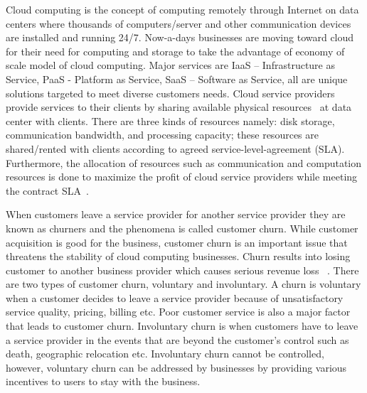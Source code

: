 Cloud computing is the concept of computing remotely through Internet on data centers where thousands of computers/server and other communication devices are installed and running 24/7. Now-a-days businesses are moving toward cloud for their need for computing and storage to take the advantage of economy of scale model of cloud computing. Major services are IaaS – Infrastructure as Service, PaaS - Platform as Service, SaaS – Software as Service, all are unique solutions targeted to meet diverse customers needs. Cloud service providers provide services to their clients by sharing available physical resources~\cite{5331755} at data center with clients. There are three kinds of resources namely: disk storage, communication bandwidth, and processing capacity; these resources are shared/rented with clients according to agreed service-level-agreement (SLA). Furthermore, the allocation of resources such as communication and computation resources is done to maximize the profit of cloud service providers while meeting the contract SLA~\cite{5176040,anand2013virtual}.

When customers leave a service provider for another service provider they are known as churners and the phenomena is called customer churn. While customer acquisition is good for the business, customer churn is an important issue that threatens the stability of cloud computing businesses. Churn results into losing customer to another business provider which causes serious revenue loss ~\cite{Huang:2012:CCP:2038068.2038213, cloudchurn2012}. There are two types of customer churn, voluntary and involuntary. A churn is voluntary when a customer decides to leave a service provider because of unsatisfactory service quality, pricing, billing etc. Poor customer service is also a major factor that leads to customer churn.  Involuntary churn is when customers have to leave a service provider in the events that are beyond the customer's control such as death, geographic relocation etc.  Involuntary churn cannot be controlled, however, voluntary churn can be addressed by businesses by providing various incentives to users to stay with the business. 


